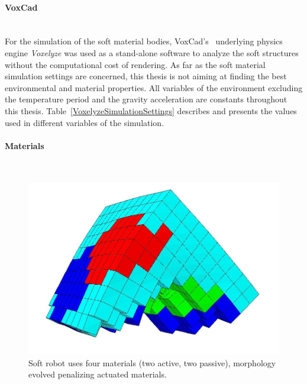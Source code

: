 \paragraph*{VoxCad}~\\

For the simulation of the soft material bodies, VoxCad's~\citep{hiller2012dynamic} underlying physics engine \emph{Voxelyze} was used as a stand-alone software to analyze the soft structures without the computational cost of rendering. As far as the soft material simulation settings are concerned, this thesis is not aiming at finding the best environmental and material properties. All variables of the environment excluding the temperature period and the gravity acceleration are constants throughout this thesis. Table~\ref{VoxelyzeSimulationSettings} describes and presents the values used in different variables of the simulation.



\paragraph*{Materials}~\\

\begin{figure}
\centering
\includegraphics[height=0.2\textheight]{../Figures/Misc/allSoftMaterials.png}
\caption{Soft robot uses four materials (two active, two passive), morphology evolved penalizing actuated materials.}
\label{fig:allSoftMaterials}
\end{figure}

